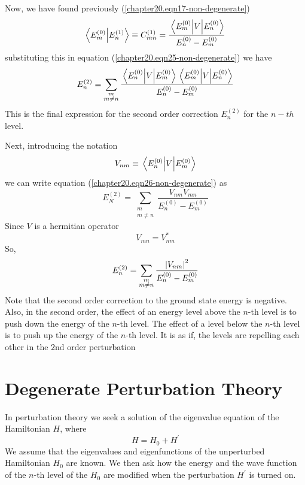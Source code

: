 	Now, we have found previously (\ref{chapter20.eqn17-non-degenerate}) 
	\begin{equation}
		\braket{E_m^{(0)}}{E_n^{(1)}} \equiv C^{(1)}_{m n} = \frac{\matrixel{E_m^{(0)}} {V} {E_n^{(0)}}}{E_n^{(0)} - E_m^{(0)}}
	\end{equation}
	substituting this in equation (\ref{chapter20.eqn25-non-degenerate}) we have
	\begin{equation}
		E_n^{(2)} = \sum_{\substack{m\\ m \neq n}} \frac{\matrixel{E_n^{(0)}} {V} {E_m^{(0)}} \matrixel{E_m^{(0)}} {V} {E_n^{(0)}}}{E_n^{(0)} - E_m^{(0)}}
		\label{chapter20.eqn26-non-degenerate} 
	\end{equation}
	This is the final expression for the second order correction $E_n^{(2)}$ for the $n-th$ level.
	
	Next, introducing the notation
	\begin{equation}
		V_{n m} \equiv \matrixel{E_n^{(0)}} {V} {E_m^{(0)}}
	\end{equation}
	we can write equation (\ref{chapter20.eqn26-non-degenerate}) as 
	\begin{equation}
		E_N^{(2)} = \sum_{\substack{m\\ m \neq n}} \frac{V_{n m} V_{m n}}{E_n^{(0)} - E_m^{(0)}}
	\end{equation}
	Since $V$ is a hermitian operator
	\begin{equation}
		V_{m n} = V_{n m}^*
	\end{equation}
	So,
	\begin{equation}
		E_n^{(2)} = \sum_{\substack{m\\ m \neq n}} \frac{\abs{V_{nm}}^2}{E_n^{(0)} - E_m^{(0)}}
		\label{chapter20.eqn27-non-degenerate} 
	\end{equation}
	Note that the second order correction to the ground state energy is negative. Also, in the second order, the effect of an energy level above the $n$-th level is to push down the energy of the $n$-th level. The effect of a level below the $n$-th level is to push up the energy of the $n$-th level. It is as if, the levels are repelling each other in the $2$nd order perturbation

\section{Degenerate Perturbation Theory}
	In perturbation theory we seek a solution of the eigenvalue equation of the Hamiltonian $H$, where
	\begin{equation}
		H = H_0 + H^\prime
		\label{chapter20.eqn1-degenerate} 
	\end{equation}
	We assume that the eigenvalues and eigenfunctions of the unperturbed Hamiltonian $H_0$ are known. We then ask how the energy and the wave function of the $n$-th level of the $H_0$ are modified when the perturbation $H^\prime$ is turned on.
	
